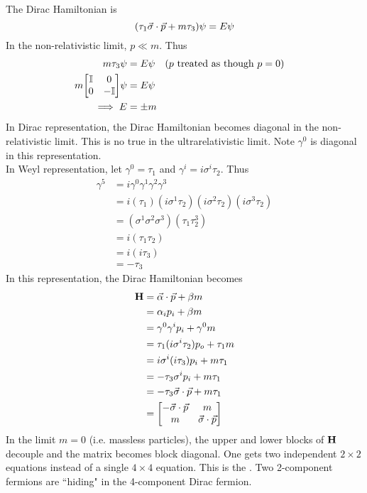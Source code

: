 \documentclass[12pt,a4paper,titlepage]{article}
\newcommand{\ul}[1]{\underline{\smash{#1}}} %
\begin{document}
The Dirac Hamiltonian is
\begin{equation}
\qty(\tau_{1}\vec{\sigma}\cdot\vec{p}+m\tau_{3})\psi=E\psi
\end{equation}
In the non-relativistic limit, $p\ll m$. Thus
\begin{equation}
\begin{aligned}
m\tau_{3}\psi&=E\psi \qq{($p$ treated as though $p=0$)}\\
m\mqty[\mathbb{I} & 0 \\ 0 & -\mathbb{I}]\psi&=E\psi\\
\implies E&=\pm m
\end{aligned}
\end{equation}
In Dirac representation, the Dirac Hamiltonian becomes diagonal in the non-relativistic limit. This is no true in the ultrarelativistic limit. Note $\gamma^{0}$ is diagonal in this representation.\\

In Weyl representation, let $\gamma^{0}=\tau_{1}$ and $\gamma^{i}=i\sigma^{i}\tau_{2}$. Thus
\begin{equation}
\begin{aligned}
\gamma^{5}&=i\gamma^{0}\gamma^{1}\gamma^{2}\gamma^{3}\\
&=i(\tau_{1})(i\sigma^{1}\tau_{2})(i\sigma^{2}\tau_{2})(i\sigma^{3}\tau_{2})\\
&=(\sigma^{1}\sigma^{2}\sigma^{3})(\tau_{1}\tau_{2}^{3})\\
&=i(\tau_{1}\tau_{2})\\
&=i(i\tau_{3})\\
&=-\tau_{3}
\end{aligned}
\end{equation}
In this representation, the Dirac Hamiltonian becomes
\begin{equation}
\begin{aligned}
\vb{H}&=\vec{\alpha}\cdot\vec{p}+\beta m\\
&=\alpha_{i}p_{i}+\beta m\\
&=\gamma^{0}\gamma^{i}p_{i}+\gamma^{0}m\\
&=\tau_{1}(i\sigma^{i}\tau_{2})p_{o}+\tau_{1}m\\
&=i\sigma^{i}(i\tau_{3})p_{i}+m\tau_{1}\\
&=-\tau_{3}\sigma^{i}p_{i}+m\tau_{1}\\
&=-\tau_{3}\vec{\sigma}\cdot\vec{p}+m\tau_{1}\\
&=\mqty[-\vec{\sigma}\cdot\vec{p} & m \\ m & \vec{\sigma}\cdot\vec{p}]
\end{aligned}
\end{equation}
In the limit $m=0$ (i.e. massless particles), the upper and lower blocks of $\vb{H}$ decouple and the matrix becomes block diagonal. One gets two independent $2\times 2$ equations instead of a single $4\times 4$ equation. This is the \ul{Weyl equation}. Two 2-component fermions are ``hiding" in the 4-component Dirac fermion.\\
\end{document}
